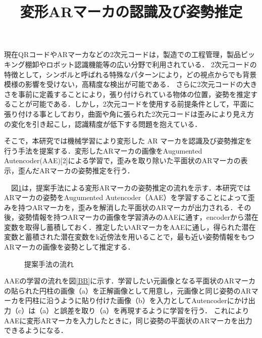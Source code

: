 \documentclass{jsarticle}
\title{変形ARマーカの認識及び姿勢推定}
\begin{document}
\maketitle

現在QRコードやARマーカなどの2次元コードは，製造での工程管理，製品ピッキング棚卸やロボット認識機能等の広い分野で利用されている．
2次元コードの特徴として，シンボルと呼ばれる特殊なパターンにより，どの視点からでも背景模様の影響を受けない，高精度な検出が可能である．
さらに2次元コードの大きさを事前に定義することにより，張り付けられている物体の位置，姿勢を推定することが可能である．しかし，2次元コードを使用する前提条件として，平面に張り付ける事としており，曲面や角に張られた2次元コードは歪みにより見え方の変化を引き起こし，認識精度が低下する問題を抱えている．

そこで，本研究では機械学習により変形した AR マーカを認識及び姿勢推定を行う手法を提案する．変形したARマーカの画像をAugumented Autencoder(AAE)[2]による学習で，歪みを取り除いた平面状のARマーカの表示，歪んだARマーカの姿勢推定を行う．


　図\ref{flow}は，提案手法による変形ARマーカの姿勢推定の流れを示す．本研究ではARマーカの姿勢をAugumented Autencoder（AAE）を学習することによって歪みを持つARマーカを，歪みを解消した平面状のARマーカが出力される．その後，姿勢情報を持つARマーカの画像を学習済みのAAEに通す，encoderから潜在変数を取得し蓄積しておく．推定したいARマーカをAAEに通し，得られた潜在変数と蓄積された潜在変数をk近傍法を用いることで，最も近い姿勢情報をもつARマーカの画像を姿勢として推定する．

\begin{figure}[ht]
\vspace{-3zh}
\setlength{\epsfxsize}{3cm}
\centerline{}
\vspace{8zh}
\caption{提案手法の流れ}
\label{flow}
\vspace{-1.0zh}
\end{figure}

AAEの学習の流れを図\ref{BB}に示す．学習したい元画像となる平面状のARマーカの貼られた円柱の画像（a）を正解画像として用意し，元画像と同じ姿勢のARマーカを円柱に沿うように貼り付けた画像（b）を入力としてAutencoderにかけ出力（c）は（a）と誤差を取り（a）を再現するように学習を行う．
これによりAAEに変形ARマーカを入力したときに，同じ姿勢の平面状のARマーカを出力できるようになる．
\end{document}
